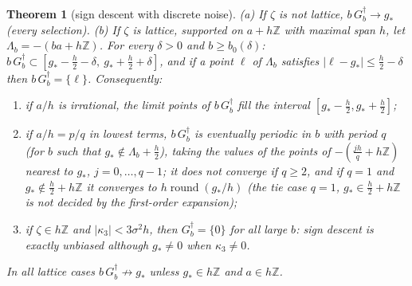 \documentclass[10pt]{article}
\newtheorem{theorem}{Theorem}
\theoremstyle{definition}
\theoremstyle{remark}
\newcommand{\Z}{\mathbb{Z}}
\newcommand{\st}{\dagger}
\begin{document}
\begin{theorem}[sign descent with discrete noise]\label{thm:sign}
(a) If $\zeta$ is not lattice, $b\,G_b^\st\to g_\ast$ (every selection). (b) If $\zeta$ is lattice, supported on
$a+h\Z$ with maximal span $h$, let $\Lambda_b=-(ba+h\Z)$. For every $\delta>0$ and $b\ge b_0(\delta)$:
$b\,G^\st_b\subset[g_\ast-\frac h2-\delta,\ g_\ast+\frac h2+\delta]$, and if a point $\ell$ of $\Lambda_b$ satisfies
$|\ell-g_\ast|\le\frac h2-\delta$ then $b\,G^\st_b=\{\ell\}$. Consequently:
\begin{enumerate}[label=(\roman*),itemsep=0pt,topsep=2pt]
\item if $a/h$ is irrational, the limit points of $b\,G_b^\st$ fill the interval $[g_\ast-\frac h2,g_\ast+\frac h2]$;
\item if $a/h=p/q$ in lowest terms, $b\,G_b^\st$ is eventually periodic in $b$ with period $q$ (for $b$ such that
$g_\ast\notin\Lambda_b+\frac h2$), taking the values of the points of $-(\frac{jh}{q}+h\Z)$ nearest to $g_\ast$,
$j=0,\dots,q-1$; it does not converge if $q\ge2$, and if $q=1$ and $g_\ast\notin\frac h2+h\Z$ it converges to $h\operatorname{round}(g_\ast/h)$ (the tie case $q=1$, $g_\ast\in\frac h2+h\Z$ is not decided by the first-order expansion);
\item if $\zeta\in h\Z$ and $|\kappa_3|<3\sigma^2h$, then $G_b^\st=\{0\}$ for all large $b$: sign descent is exactly
unbiased although $g_\ast\ne0$ when $\kappa_3\ne0$.
\end{enumerate}
In all lattice cases $b\,G_b^\st\not\to g_\ast$ unless $g_\ast\in h\Z$ and $a\in h\Z$.
\end{theorem}
\end{document}
